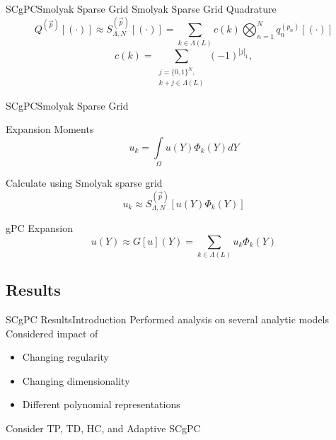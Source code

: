 \documentclass{beamer}
\begin{document}
\begin{frame}{SCgPC}{Smolyak Sparse Grid}%
  Smolyak Sparse Grid Quadrature
  \begin{equation*}
    Q^{(\vec p)}[(\cdot)]\approx S^{(\vec p)}_{\Lambda,N}[(\cdot)] = \sum_{k\in\Lambda(L)} c(k)\bigotimes_{n=1}^N
    q^{(p_n)}_n[(\cdot)]
  \end{equation*}
  \begin{equation*}
    c(k) = \sum_{\substack{j=\{0,1\}^N,\\k+j\in\Lambda(L)}} (-1)^{|j|_1},
  \end{equation*}
\end{frame}


\begin{frame}{SCgPC}{Smolyak Sparse Grid}\vspace{-20pt}
  \begin{alertblock}{Expansion Moments}
    \[u_k = \int\limits_\Omega u(Y)\Phi_k(Y) dY\]
  \end{alertblock}
  Calculate using Smolyak sparse grid
  \begin{equation*}
    u_k \approx S^{(\vec p)}_{\Lambda,N}[u(Y)\Phi_k(Y)]
  \end{equation*}
  \begin{block}{gPC Expansion}
    \[u(Y) \approx G[u](Y) = \sum_{k\in\Lambda(L)} u_k \Phi_k(Y)\]
  \end{block}
\end{frame}



\subsection{Results}

\begin{frame}{SCgPC Results}{Introduction}\vspace{-20pt}
  \vfill
Performed analysis on several analytic models
  \vfill
Considered impact of
  \vfill
\begin{itemize}
  \item Changing regularity
  \vfill
  \item Changing dimensionality
  \vfill
  \item Different polynomial representations
\end{itemize}
  \vfill
  Consider TP, TD, HC, and Adaptive SCgPC
  \vfill
\end{frame}
\end{document}
